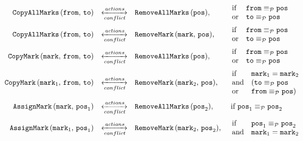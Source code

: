 \documentclass{article}
\newcommand{\cActions}{\xleftrightarrow[conflict]{actions}}
\newcommand{\pEquiv}{\equiv_\mathcal{P}}
\begin{document}
{\footnotesize \[
\begin{array}{rcll}

\texttt{CopyAllMarks}\,(\texttt{from},\,\texttt{to}) &
\cActions &
\texttt{RemoveAllMarks}\,(\texttt{pos}), &
\begin{array}{ll}
\mbox{if} & \texttt{from} \pEquiv \texttt{pos} \\
\mbox{or} & \texttt{to} \pEquiv \texttt{pos}
\end{array}
\vspace{2mm} \\

\texttt{CopyAllMarks}\,(\texttt{from},\,\texttt{to}) &
\cActions &
\texttt{RemoveMark}\,(\texttt{mark},\,\texttt{pos}), &
\begin{array}{ll}
\mbox{if} & \texttt{from} \pEquiv \texttt{pos} \\
\mbox{or} & \texttt{to} \pEquiv \texttt{pos}
\end{array}
\vspace{2mm}\\

\texttt{CopyMark}\,(\texttt{mark},\,\texttt{from},\,\texttt{to}) &
\cActions &
\texttt{RemoveAllMarks}\,(\texttt{pos}), &
\begin{array}{ll}
\mbox{if} & \texttt{from} \pEquiv \texttt{pos} \\
\mbox{or} & \texttt{to} \pEquiv \texttt{pos}
\end{array}
\vspace{2mm} \\

\texttt{CopyMark}\,(\texttt{mark}_1,\,\texttt{from},\,\texttt{to}) &
\cActions &
\texttt{RemoveMark}\,(\texttt{mark}_2,\,\texttt{pos}), &
\begin{array}{ll}
\mbox{if} & \texttt{mark}_1 = \texttt{mark}_2 \\
\mbox{and} & (\texttt{to} \pEquiv \texttt{pos} \\
\mbox{or} & \texttt{from} \pEquiv \texttt{pos})
\end{array}
\vspace{2mm} \\

\texttt{AssignMark}\,(\texttt{mark},\,\texttt{pos}_1) &
\cActions &
\texttt{RemoveAllMarks}\,(\texttt{pos}_2), &
\mbox{ if } \texttt{pos}_1 \pEquiv \texttt{pos}_2
\vspace{2mm} \\

\texttt{AssignMark}\,(\texttt{mark}_1,\,\texttt{pos}_1) &
\cActions &
\texttt{RemoveMark}\,(\texttt{mark}_2,\,\texttt{pos}_2), &
\begin{array}{ll}
\mbox{if} & \texttt{pos}_1 \pEquiv \texttt{pos}_2 \\
\mbox{and} & \texttt{mark}_1 = \texttt{mark}_2
\end{array}
\vspace{2mm} \\


\end{array}\]}
\end{document}
